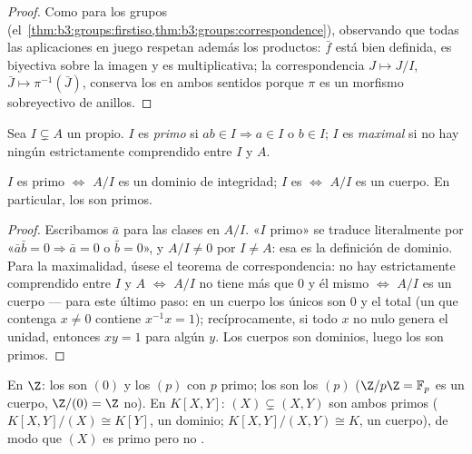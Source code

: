 \begin{proof}
Como para los grupos
(el~\cref{thm:b3:groups:firstiso,thm:b3:groups:correspondence}),
observando que todas las aplicaciones en juego respetan además los
productos: $\bar f$ está bien definida, es biyectiva sobre la imagen y
es multiplicativa; la correspondencia $J \mapsto J/I$,
$\bar J \mapsto \pi^{-1}(\bar J)$, conserva los
 en ambos sentidos porque $\pi$ es
un morfismo sobreyectivo de anillos.
\end{proof}

\begin{definition}\label{def:b3:rings:primemaximal}
Sea $I \subsetneq A$ un  propio. $I$
es \emph{primo} si $ab \in I \Rightarrow a \in I$ o
$b \in I$; $I$ es \emph{maximal} si no hay ningún
 estrictamente comprendido entre $I$ y
$A$.
\end{definition}

\begin{proposition}\label{prop:b3:rings:primemaximal}
$I$ es primo $\iff$ $A/I$ es un dominio de integridad; $I$ es
 $\iff$ $A/I$ es un cuerpo.
En particular, los 
son primos.
\end{proposition}

\begin{proof}
Escribamos $\bar a$ para las clases en $A/I$. «$I$ primo» se traduce
literalmente por «$\bar a\bar b = 0 \Rightarrow \bar a = 0$ o $\bar b
= 0$», y $A/I \neq 0$ por $I \neq A$: esa es la definición de dominio.
Para la maximalidad, úsese el teorema de correspondencia: no hay
 estrictamente comprendido entre $I$ y
$A$ $\iff$ $A/I$ no tiene más  que
$0$ y él mismo $\iff$ $A/I$ es un cuerpo --- para este último paso: en
un cuerpo los únicos  son $0$ y el
total (un  que contenga $x \ne 0$
contiene $x^{-1}x = 1$); recíprocamente, si todo $x$ no nulo genera el
 unidad, entonces $xy = 1$ para algún
$y$. Los cuerpos son dominios, luego los
 son primos.
\end{proof}

\begin{example}\label{ex:b3:rings:primemaximal}
En $\Z$: los  son
$(0)$ y los $(p)$ con $p$ primo; los
 son los $(p)$
($\Z/p\Z = \mathbb F_p$ es un cuerpo, $\Z/(0) = \Z$ no). En $K[X, Y]$:
$(X) \subsetneq (X, Y)$ son ambos primos ($K[X,Y]/(X) \cong K[Y]$, un
dominio; $K[X,Y]/(X,Y) \cong K$, un cuerpo), de modo que $(X)$ es primo
pero no .
\end{example}

